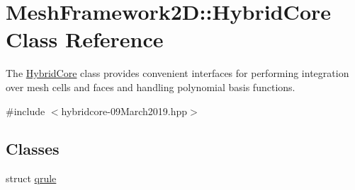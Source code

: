 \hypertarget{classMeshFramework2D_1_1HybridCore}{}\section{Mesh\+Framework2D\+:\+:Hybrid\+Core Class Reference}
\label{classMeshFramework2D_1_1HybridCore}


The \hyperlink{classMeshFramework2D_1_1HybridCore}{Hybrid\+Core} class provides convenient interfaces for performing integration over mesh cells and faces and handling polynomial basis functions.  




{\ttfamily \#include $<$hybridcore-\/09\+March2019.\+hpp$>$}

\subsection*{Classes}
\begin{DoxyCompactItemize}
\item 
struct \hyperlink{structMeshFramework2D_1_1HybridCore_1_1qrule}{qrule}
\end{DoxyCompactItemize}
